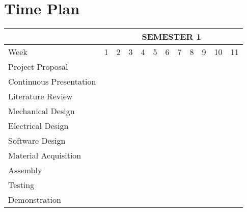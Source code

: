 \clearpage
\section{Time Plan}

\begin{table}[htb]
  \begin{center}
    \leavevmode
\begin{tabular}{|l|c|c|c|c|c|c|c|c|c|c|c|} \hline
& \multicolumn{11}{c|}{SEMESTER 1} \\ \hline
\rowcolor{white} Week & 1 & 2 & 3 & 4 & 5 & 6 & 7 & 8 & 9 & 10 & 11 \\ \hline
\rowcolor{white} Project Proposal & & \cellcolor{yellow} & \cellcolor{yellow} & \cellcolor{yellow} & & & & & & & \\ \hline
\rowcolor{white} Continuous Presentation & & & & & \cellcolor{yellow} & \cellcolor{yellow} & \cellcolor{yellow} & \cellcolor{yellow} & \cellcolor{yellow} & \cellcolor{yellow} & \cellcolor{yellow} \\ \hline
\rowcolor{white} Literature Review & & & & & & \cellcolor{yellow} & \cellcolor{yellow} & \cellcolor{yellow} & \cellcolor{yellow} & \cellcolor{yellow} & \cellcolor{yellow} \\ \hline
\rowcolor{white} Mechanical Design & & & & & & & \cellcolor{yellow} & \cellcolor{yellow} & \cellcolor{yellow} & \cellcolor{yellow} & \\ \hline
\rowcolor{white} Electrical Design & & & & & & & \cellcolor{yellow} & \cellcolor{yellow} & \cellcolor{yellow} & \cellcolor{yellow} & \\ \hline
\rowcolor{white} Software Design & & & & & & & & & \cellcolor{yellow} & \cellcolor{yellow} & \cellcolor{yellow} \\ \hline
\rowcolor{white} Material Acquisition & & & & & & & & & & & \cellcolor{yellow} \\ \hline
\rowcolor{white} Assembly & & & & & & & & & & & \\ \hline
\rowcolor{white}Testing & & & & & & & & & & & \\ \hline
\rowcolor{white} Demonstration & & & & & & & & & & & \\ \hline
\end{tabular}
\label{table:semester1timeplan}
\end{center}
\end{table}

